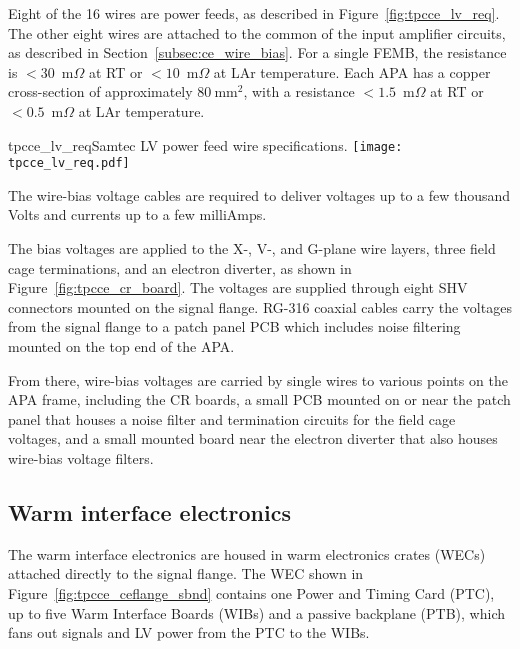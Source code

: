 Eight of the 16 wires are power feeds, as described in Figure~\ref{fig:tpcce_lv_req}. The other eight wires
are attached to the common of the input amplifier circuits, as described in Section~\ref{subsec:ce_wire_bias}.
For
a single FEMB, the resistance is $<30$~m$\Omega$ at RT or $<10$~m$\Omega$ at LAr temperature. Each APA has a copper cross-section of approximately $80~\mathrm{mm}^2$, with
a resistance $<1.5$~m$\Omega$ at RT or $<0.5$~m$\Omega$ at LAr temperature.

\begin{cdrfigure}{tpcce_lv_req}{Samtec LV power feed wire 
specifications.}
\texttt{[image: tpcce\_lv\_req.pdf]}
\end{cdrfigure}


The wire-bias voltage cables are required to deliver voltages up to a few thousand Volts and currents up to a few
milliAmps.

The bias voltages are applied to the X-, V-, and G-plane wire layers, three field cage terminations, 
and an electron diverter, as shown in Figure~\ref{fig:tpcce_cr_board}. The voltages are supplied 
through eight SHV connectors mounted on the signal flange. RG-316 coaxial cables carry the voltages 
from the signal flange to a patch panel PCB which includes noise filtering mounted on the top 
end of the APA. 

From there, wire-bias voltages are carried by single wires to 
various points on the APA frame, including the CR boards, a small PCB mounted on or near 
the patch panel that houses a noise filter and termination circuits for the field cage voltages, and 
a small mounted board near the electron diverter that also houses wire-bias voltage filters.


\subsection{Warm interface electronics}
\label{subsec:warm_interface_elec}

The warm interface electronics are housed in warm electronics crates (WECs)
attached directly to the signal flange.  The WEC shown in Figure~\ref{fig:tpcce_ceflange_sbnd} 
contains one
Power and Timing Card (PTC), up to five Warm Interface Boards (WIBs) and a passive
backplane (PTB), which fans out signals and LV power from the PTC to the WIBs.


